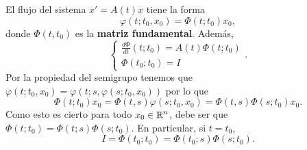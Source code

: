 \begin{observation}[Recordatorio]
El flujo del sistema $\displaystyle x' = A\left(t\right)x $ tiene la forma 
\[\varphi\left(t; t_{0}, x_{0}\right)=\Phi\left(t; t_{0}\right)x_{0} ,\]
donde $\displaystyle \Phi\left(t, t_{0}\right) $ es la \textbf{matriz fundamental}. Además, 
\[
\begin{cases}
\frac{d\Phi}{dt}\left(t; t_{0}\right)=A\left(t\right)\Phi\left(t; t_{0}\right) \\
\Phi\left(t_{0}; t_{0}\right)=I
\end{cases}
.\]
Por la propiedad del semigrupo tenemos que $\displaystyle \varphi\left(t; t_{0}, x_{0}\right)=\varphi\left(t; s, \varphi\left(s; t_{0}, x_{0}\right)\right)  $ por lo que
\[ \Phi\left(t; t_{0}\right)x_{0}=\Phi\left(t,s\right)\varphi\left(s; t_{0}, x_{0}\right)=\Phi\left(t,s\right)\Phi\left(s;t_{0}\right)x_{0}.\]
Como esto es cierto para todo $\displaystyle x_{0}\in \mathbb{R}^{n} $, debe ser que $\displaystyle \Phi\left(t; t_{0}\right)=\Phi\left(t; s\right)\Phi\left(s; t_{0}\right) $. En particular, si $\displaystyle t = t_{0} $,
\[I = \Phi\left(t_{0}; t_{0}\right)=\Phi\left(t_{0}; s\right)\Phi\left(s; t_{0}\right) .\]
\end{observation}

